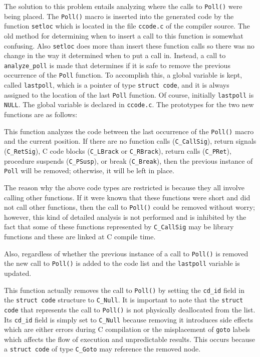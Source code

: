 The solution to this problem entails analyzing where the calls to
\texttt{Poll()} were being placed. The \texttt{Poll()} macro is
inserted into the generated code by the function \texttt{setloc} which
is located in the file \texttt{ccode.c} of the compiler source. The
old method for determining when to insert a call to this function is
somewhat confusing. Also \texttt{setloc} does more than insert these
function calls so there was no change in the way it determined when to
put a call in. Instead, a call to \texttt{analyze\_poll} is made that
determines if it is safe to remove the previous occurrence of the
\texttt{Poll} function. To accomplish this, a global variable is kept,
called \texttt{lastpoll}, which is a pointer of type \texttt{struct
code}, and it is always assigned to the location of the last
\texttt{Poll} function. Of course, initially \texttt{lastpoll} is
\texttt{NULL}. The global variable is declared in
\texttt{ccode.c}. The prototypes for the two new functions are as
follows:


This function analyzes the code between the last occurrence of the
\texttt{Poll()} macro and the current position. If there are no
function calls (\texttt{C\_CallSig}), return signals
(\texttt{C\_RetSig}), C code blocks (\texttt{C\_LBrack} or
\texttt{C\_RBrack}), return calls (\texttt{C\_PRet}), procedure
suspends (\texttt{C\_PSusp}), or break (\texttt{C\_Break}), then the
previous instance of \texttt{Poll} will be removed; otherwise, it will
be left in place.

The reason why the above code types are restricted is because they all
involve calling other functions. If it were known that these functions
were short and did not call other functions, then the call to
\texttt{Poll()} could be removed without worry; however, this kind of
detailed analysis is not performed and is inhibited by the fact that
some of these functions represented by \texttt{C\_CallSig} may be
library functions and these are linked at C compile time.

Also, regardless of whether the previous instance of a call to
\texttt{Poll()} is removed the new call to \texttt{Poll()} is added to
the code list and the \texttt{lastpoll} variable is updated.



This function actually removes the call to \texttt{Poll()} by setting
the \texttt{cd\_id} field in the \texttt{struct code} structure to
\texttt{C\_Null}. It is important to note that the \texttt{struct
code} that represents the call to \texttt{Poll()} is not physically
deallocated from the list. Its \texttt{cd\_id} field is simply set
to \texttt{C\_Null} because removing it introduces side effects which
are either errors during C compilation or the misplacement of
\texttt{goto} labels which affects the flow of execution and
unpredictable results. This occurs because a \texttt{struct code}
of type \texttt{C\_Goto} may reference the removed node.

